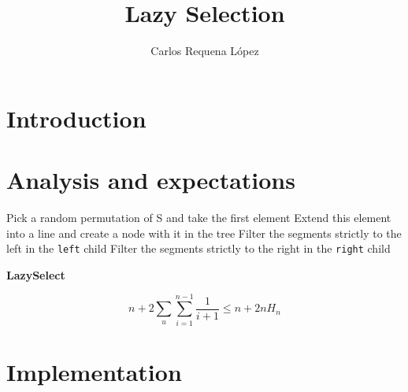 \documentclass[12pt,a4paper]{article}
\title{Lazy Selection}
\author{Carlos Requena López}
\begin{document}
\maketitle
\thispagestyle{empty}
\tableofcontents
\newpage
\pagestyle{fancy}
\setcounter{page}{1}


\section{Introduction}

\section{Analysis and expectations}


\begin{algorithm}[h]
  \SetAlgoLined

  \nl Pick a random permutation of S and take the first element\;
  \nl Extend this element into a line and create a node with it in the tree\;
  \nl Filter the segments strictly to the left in the \texttt{left}
  child\;
  \nl Filter the segments strictly to the right in the \texttt{right}
  child\;
  \nl {}
  \nl {}
\caption{\bf LazySelect}
\label{algo}
\end{algorithm}


\begin{equation}
  \label{eq:upper-bound}
  n + 2 \sum_u \sum_{i=1}^{n-1} \frac{1}{i+1} \leq n + 2nH_n
\end{equation}


\section[Implementation]{Implementation}

\end{document}
